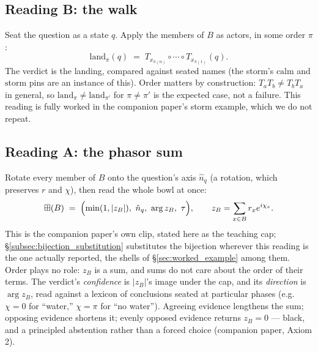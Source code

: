\documentclass[12pt, a4paper]{article}
\begin{document}
\subsection{Reading B: the walk}
\label{subsec:reading_b}
Seat the question as a state $q$. Apply the members of $B$ as actors,
in some order $\pi$:
\[
    \mathrm{land}_\pi(q) \;=\; T_{x_{\pi(n)}}\circ\cdots\circ
    T_{x_{\pi(1)}}(q).
\]
The verdict is the landing, compared against seated names (the storm's
$\mathrm{calm}$ and $\mathrm{storm}$ pins are an instance of this).
Order matters by construction: $T_a T_b\neq T_b T_a$ in general, so
$\mathrm{land}_\pi \neq \mathrm{land}_{\pi'}$ for $\pi\neq\pi'$ is the
expected case, not a failure. This reading is fully worked in the
companion paper's storm example, which we do not repeat.

\subsection{Reading A: the phasor sum}
\label{subsec:reading_a}
Rotate every member of $B$ onto the question's axis $\hat n_q$ (a
rotation, which preserves $r$ and $\chi$), then read the whole bowl at
once:
\[
    \boxplus(B) \;=\; \Bigl(\min(1,|z_B|),\ \hat n_q,\ \arg z_B,\ \tau\Bigr),
    \qquad
    z_B=\sum_{x\in B} r_x e^{i\chi_x}.
\]
This is the companion paper's own clip, stated here as the teaching
cap; \S\ref{subsec:bijection_substitution} substitutes the bijection
wherever this reading is the one actually reported, the shells of
\S\ref{sec:worked_example} among them.
Order plays no role: $z_B$ is a sum, and sums do not care about the
order of their terms. The verdict's \emph{confidence} is $|z_B|$'s
image under the cap, and its \emph{direction} is $\arg z_B$, read
against a lexicon of conclusions seated at particular phases (e.g.\
$\chi=0$ for ``water,'' $\chi=\pi$ for ``no water''). Agreeing evidence
lengthens the sum; opposing evidence shortens it; evenly opposed
evidence returns $z_B=0$ --- black, and a principled abstention rather
than a forced choice (companion paper, Axiom 2).
\end{document}
